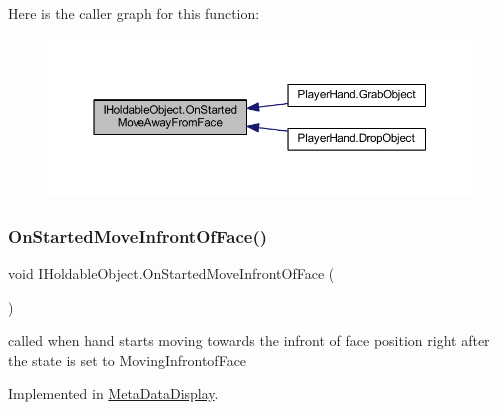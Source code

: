 Here is the caller graph for this function\+:
\nopagebreak
\begin{figure}[H]
\begin{center}
\leavevmode
\includegraphics[width=350pt]{interface_i_holdable_object_a75f802a9736db51e5e8d1568689dd11c_icgraph}
\end{center}
\end{figure}
\mbox{\label{interface_i_holdable_object_af5dcdd5524539104706dadd8a0e15e08}} 
\subsubsection{\texorpdfstring{On\+Started\+Move\+Infront\+Of\+Face()}{OnStartedMoveInfrontOfFace()}}
{\footnotesize\ttfamily void I\+Holdable\+Object.\+On\+Started\+Move\+Infront\+Of\+Face (\begin{DoxyParamCaption}{ }\end{DoxyParamCaption})}



called when hand starts moving towards the infront of face position right after the state is set to Moving\+Infrontof\+Face 



Implemented in \mbox{\hyperlink{class_meta_data_display_aa0a9b9ca8243943104c82602e69a0541}{Meta\+Data\+Display}}.

